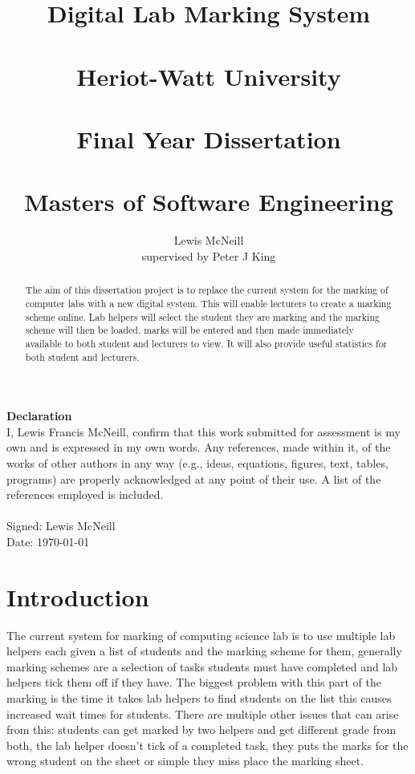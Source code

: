 \documentclass[12pt]{article}  %
\title{Digital Lab Marking System \\~\\  \large{Heriot-Watt University} \\~\\ Final Year Dissertation \\~\\ Masters of Software Engineering}
\author{Lewis McNeill\\
supervised by
Peter J King}
\begin{document}
\maketitle
{}
\newpage

\doublespacing
\textbf{\Large{Declaration}} \\[2em]
I, Lewis Francis McNeill, confirm that this work submitted for assessment is my own and is expressed in my own words. Any references, made within it, of the works of other authors in any way (e.g., ideas, equations, figures, text, tables, programs) are properly acknowledged at any point of their use. A list of the references employed is included.
\\
\\
Signed: Lewis McNeill
\\
Date: \today



\newpage                 
\begin{abstract}

\noindent
The aim of this dissertation project is to replace the current system for the marking of computer labs with a new digital system. This will enable lecturers to create a marking scheme online. Lab helpers will select the student they are marking and the marking scheme will then be loaded, marks will be entered and then made immediately available to both student and lecturers to view. It will also provide useful statistics for both student and lecturers.

\end{abstract}

\newpage                  
\tableofcontents


\newpage     

\setcounter{page}{1}

\section{Introduction}

The current system for marking of computing science lab is to use multiple lab helpers each given a list of students and the marking scheme for them, generally marking schemes are a selection of tasks students must have completed and lab helpers tick them off if they have. The biggest problem with this part of the marking is the time it takes lab helpers to find students on the list this causes increased wait times for students. There are multiple other issues that can arise from this: students can get marked by two helpers and get different grade from both, the lab helper doesn't tick of a completed task, they puts the marks for the wrong student on the sheet or simple they miss place the marking sheet.
\end{document}
